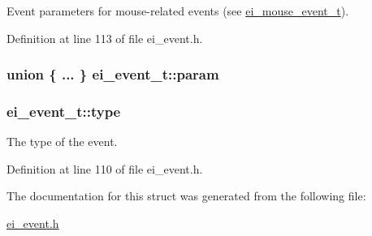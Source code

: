 Event parameters for mouse-\/related events (see \hyperlink{structei__mouse__event__t}{ei\+\_\+mouse\+\_\+event\+\_\+t}). 



Definition at line 113 of file ei\+\_\+event.\+h.

\hypertarget{structei__event__t_a03a01773dff790d4b772f6b16e4fbb4b}{
\subsubsection[{param}]{\setlength{\rightskip}{0pt plus 5cm}union \{ ... \}   ei\+\_\+event\+\_\+t\+::param}}\label{structei__event__t_a03a01773dff790d4b772f6b16e4fbb4b}
\hypertarget{structei__event__t_aee18f11986ed603959de628558812c58}{
\subsubsection[{type}]{ ei\+\_\+event\+\_\+t\+::type}}\label{structei__event__t_aee18f11986ed603959de628558812c58}


The type of the event. 



Definition at line 110 of file ei\+\_\+event.\+h.



The documentation for this struct was generated from the following file\+:\begin{DoxyCompactItemize}
\item 
\hyperlink{ei__event_8h}{ei\+\_\+event.\+h}\end{DoxyCompactItemize}
